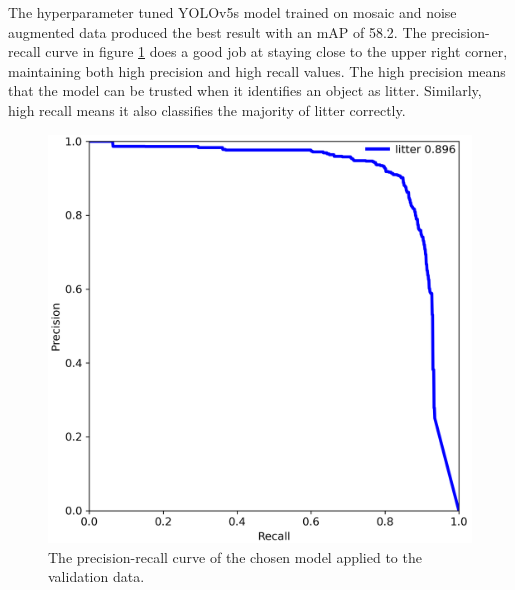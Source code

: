\documentclass{thesis}
\begin{document}
The hyperparameter tuned YOLOv5s model trained on mosaic and noise augmented data produced the best result with an mAP of 58.2. The precision-recall curve in figure \ref{fig:pr-curve} does a good job at staying close to the upper right corner, maintaining both high precision and high recall values. The high precision means that the model can be trusted when it identifies an object as litter. Similarly, high recall means it also classifies the majority of litter correctly.

\begin{figure}[h!]
    \centering
    \includegraphics[scale=0.5]{images/pr-curve.png}
    \caption{The precision-recall curve of the chosen model applied to the validation data.}
    \label{fig:pr-curve}
\end{figure}
\end{document}
